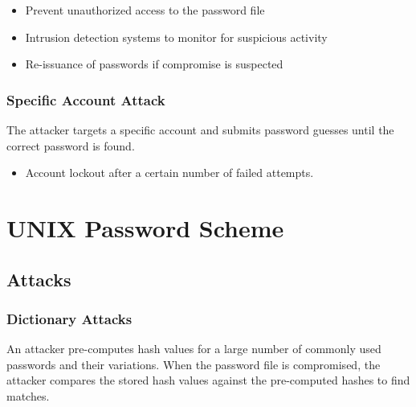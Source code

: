 \documentclass[12pt letter]{report}
\begin{document}
\begin{itemize}
  \item Prevent unauthorized access to the password file
  \item Intrusion detection systems to monitor for suspicious activity
  \item Re-issuance of passwords if compromise is suspected
\end{itemize}

\subsubsection{Specific Account Attack}

The attacker targets a specific account and submits password guesses
until the correct password is found.

\begin{itemize}
  \item Account lockout after a certain number of failed attempts.
\end{itemize}

\section{UNIX Password Scheme}


\subsection{Attacks}

\subsubsection{Dictionary Attacks}
An attacker pre-computes hash values for a large number of
commonly used passwords and their variations. When the password file
is compromised, the attacker compares the stored hash values against
the pre-computed hashes to find matches.
\end{document}
